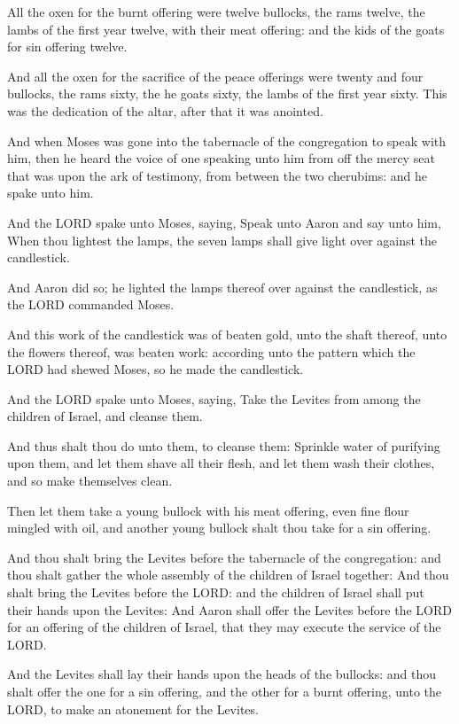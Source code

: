 \Verse All the oxen for the burnt offering were twelve bullocks, the
rams twelve, the lambs of the first year twelve, with their meat
offering: and the kids of the goats for sin offering twelve.

\Verse And all the oxen for the sacrifice of the peace offerings were
twenty and four bullocks, the rams sixty, the he goats sixty, the
lambs of the first year sixty. This was the dedication of the altar,
after that it was anointed.

\Verse And when Moses was gone into the tabernacle of the congregation
to speak with him, then he heard the voice of one speaking unto him
from off the mercy seat that was upon the ark of testimony, from
between the two cherubims: and he spake unto him.


\Chapter
\Verse And the LORD spake unto Moses, saying, \Verse Speak unto Aaron and
say unto him, When thou lightest the lamps, the seven lamps shall give
light over against the candlestick.

\Verse And Aaron did so; he lighted the lamps thereof over against the
candlestick, as the LORD commanded Moses.

\Verse And this work of the candlestick was of beaten gold, unto the
shaft thereof, unto the flowers thereof, was beaten work: according
unto the pattern which the LORD had shewed Moses, so he made the
candlestick.

\Verse And the LORD spake unto Moses, saying, \Verse Take the Levites from
among the children of Israel, and cleanse them.

\Verse And thus shalt thou do unto them, to cleanse them: Sprinkle water
of purifying upon them, and let them shave all their flesh, and let
them wash their clothes, and so make themselves clean.

\Verse Then let them take a young bullock with his meat offering, even
fine flour mingled with oil, and another young bullock shalt thou take
for a sin offering.

\Verse And thou shalt bring the Levites before the tabernacle of the
congregation: and thou shalt gather the whole assembly of the children
of Israel together: \Verse And thou shalt bring the Levites before the
LORD: and the children of Israel shall put their hands upon the
Levites: \Verse And Aaron shall offer the Levites before the LORD for an
offering of the children of Israel, that they may execute the service
of the LORD.

\Verse And the Levites shall lay their hands upon the heads of the
bullocks: and thou shalt offer the one for a sin offering, and the
other for a burnt offering, unto the LORD, to make an atonement for
the Levites.

